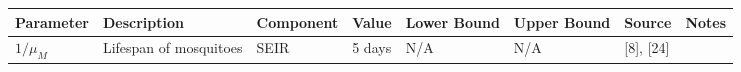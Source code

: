\documentclass[10pt,letterpaper]{article}
\begin{document}
\begin{longtable}[]{@{}llllllll@{}}
\toprule
\begin{minipage}[b]{0.04\columnwidth}\raggedright\strut
Parameter\strut
\end{minipage} & \begin{minipage}[b]{0.17\columnwidth}\raggedright\strut
Description\strut
\end{minipage} & \begin{minipage}[b]{0.05\columnwidth}\raggedright\strut
Component\strut
\end{minipage} & \begin{minipage}[b]{0.05\columnwidth}\raggedright\strut
Value\strut
\end{minipage} & \begin{minipage}[b]{0.04\columnwidth}\raggedright\strut
Lower Bound\strut
\end{minipage} & \begin{minipage}[b]{0.04\columnwidth}\raggedright\strut
Upper Bound\strut
\end{minipage} & \begin{minipage}[b]{0.14\columnwidth}\raggedright\strut
Source\strut
\end{minipage} & \begin{minipage}[b]{0.26\columnwidth}\raggedright\strut
Notes\strut
\end{minipage}\tabularnewline
\midrule
\endhead
\begin{minipage}[t]{0.04\columnwidth}\raggedright\strut
\(1/\mu_M\)\strut
\end{minipage} & \begin{minipage}[t]{0.17\columnwidth}\raggedright\strut
Lifespan of mosquitoes\strut
\end{minipage} & \begin{minipage}[t]{0.05\columnwidth}\raggedright\strut
SEIR\strut
\end{minipage} & \begin{minipage}[t]{0.05\columnwidth}\raggedright\strut
5 days\strut
\end{minipage} & \begin{minipage}[t]{0.04\columnwidth}\raggedright\strut
N/A\strut
\end{minipage} & \begin{minipage}[t]{0.04\columnwidth}\raggedright\strut
N/A\strut
\end{minipage} & \begin{minipage}[t]{0.14\columnwidth}\raggedright\strut
{[}8{]}, {[}24{]}\strut
\end{minipage} & \begin{minipage}[t]{0.26\columnwidth}\raggedright\strut

\end{minipage}
\end{longtable}
\end{document}
